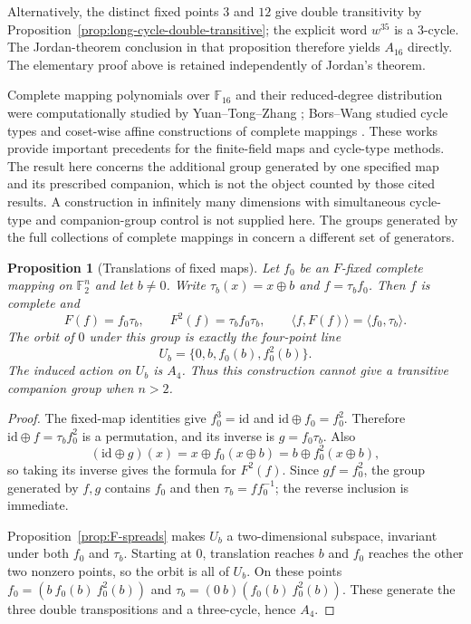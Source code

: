 \documentclass[11pt]{article}
\newtheorem{proposition}[theorem]{Proposition}
\begin{document}
Alternatively, the distinct fixed points $3$ and $12$ give double
transitivity by Proposition~\ref{prop:long-cycle-double-transitive};
the explicit word $w^{35}$ is a $3$-cycle. The Jordan-theorem
conclusion in that proposition therefore yields $A_{16}$ directly.
The elementary proof above is retained independently of Jordan's theorem.

Complete mapping polynomials over $\mathbb F_{16}$ and their reduced-degree
distribution were computationally studied by Yuan--Tong--Zhang \cite{YTZ07};
Bors--Wang studied cycle types and coset-wise affine constructions of
complete mappings \cite{BW21,BWcos22}. These works provide important
precedents for the finite-field maps and cycle-type methods. The result here
concerns the additional group generated by one specified map and its
prescribed companion, which is not the object counted by those cited results.
A construction in infinitely many dimensions with simultaneous cycle-type
and companion-group control is not supplied here. The groups generated by
the full collections of complete mappings in \cite{BW22} concern a different
set of generators.

\begin{proposition}[Translations of fixed maps]\label{prop:translated-fixed}
Let $f_0$ be an $F$-fixed complete mapping on $\mathbb F_2^n$ and
let $b\ne0$. Write $\tau_b(x)=x\oplus b$ and $f=\tau_b f_0$.
Then $f$ is complete and
\[
F(f)=f_0\tau_b,\qquad
F^2(f)=\tau_b f_0\tau_b,\qquad
\langle f,F(f)\rangle=\langle f_0,\tau_b\rangle.
\]
The orbit of $0$ under this group is exactly the four-point line
\[
U_b=\{0,b,f_0(b),f_0^2(b)\}.
\]
The induced action on $U_b$ is $A_4$.
Thus this construction cannot give a transitive companion group
when $n>2$.
\end{proposition}
\begin{proof}
The fixed-map identities give $f_0^3=\mathrm{id}$ and
$\mathrm{id}\oplus f_0=f_0^2$.
Therefore $\mathrm{id}\oplus f=\tau_b f_0^2$ is a permutation,
and its inverse is $g=f_0\tau_b$.
Also
\[
(\mathrm{id}\oplus g)(x)
=x\oplus f_0(x\oplus b)
=b\oplus f_0^2(x\oplus b),
\]
so taking its inverse gives the formula for $F^2(f)$.
Since $gf=f_0^2$, the group generated by $f,g$ contains $f_0$
and then $\tau_b=ff_0^{-1}$; the reverse inclusion is immediate.

Proposition~\ref{prop:F-spreads} makes $U_b$ a two-dimensional
subspace, invariant under both $f_0$ and $\tau_b$.
Starting at $0$, translation reaches $b$ and $f_0$ reaches the other
two nonzero points, so the orbit is all of $U_b$.
On these points $f_0=(b\ f_0(b)\ f_0^2(b))$ and
$\tau_b=(0\ b)(f_0(b)\ f_0^2(b))$.
These generate the three double transpositions and a three-cycle,
hence $A_4$.
\end{proof}
\end{document}
